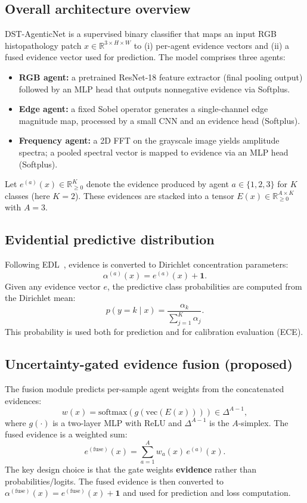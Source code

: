 \documentclass[10pt]{article}
\begin{document}
\subsection{Overall architecture overview}
DST-AgenticNet is a supervised binary classifier that maps an input RGB histopathology patch $x \in \mathbb{R}^{3 \times H \times W}$ to (i) per-agent evidence vectors and (ii) a fused evidence vector used for prediction. The model comprises three agents:
\begin{itemize}
  \item \textbf{RGB agent:} a pretrained ResNet-18 feature extractor (final pooling output) followed by an MLP head that outputs nonnegative evidence via Softplus.
  \item \textbf{Edge agent:} a fixed Sobel operator generates a single-channel edge magnitude map, processed by a small CNN and an evidence head (Softplus).
  \item \textbf{Frequency agent:} a 2D FFT on the grayscale image yields amplitude spectra; a pooled spectral vector is mapped to evidence via an MLP head (Softplus).
\end{itemize}
Let $e^{(a)}(x) \in \mathbb{R}_{\ge 0}^{K}$ denote the evidence produced by agent $a \in \{1,2,3\}$ for $K$ classes (here $K=2$). These evidences are stacked into a tensor $E(x) \in \mathbb{R}_{\ge 0}^{A \times K}$ with $A=3$.

\subsection{Evidential predictive distribution}
Following EDL~\cite{sensoy2018}, evidence is converted to Dirichlet concentration parameters:
\begin{equation}
  \alpha^{(a)}(x) = e^{(a)}(x) + \mathbf{1}.
\end{equation}
Given any evidence vector $e$, the predictive class probabilities are computed from the Dirichlet mean:
\begin{equation}
  p(y=k \mid x) = \frac{\alpha_k}{\sum_{j=1}^{K} \alpha_j}.
\end{equation}
This probability is used both for prediction and for calibration evaluation (ECE).

\subsection{Uncertainty-gated evidence fusion (proposed)}
The fusion module predicts per-sample agent weights from the concatenated evidences:
\begin{equation}
  w(x) = \mathrm{softmax}\left(g\left(\mathrm{vec}(E(x))\right)\right) \in \Delta^{A-1},
\end{equation}
where $g(\cdot)$ is a two-layer MLP with ReLU and $\Delta^{A-1}$ is the $A$-simplex. The fused evidence is a weighted sum:
\begin{equation}
  e^{(\mathrm{fuse})}(x) = \sum_{a=1}^{A} w_a(x)\, e^{(a)}(x).
\end{equation}
The key design choice is that the gate weights \textbf{evidence} rather than probabilities/logits. The fused evidence is then converted to $\alpha^{(\mathrm{fuse})}(x) = e^{(\mathrm{fuse})}(x) + \mathbf{1}$ and used for prediction and loss computation.
\end{document}
